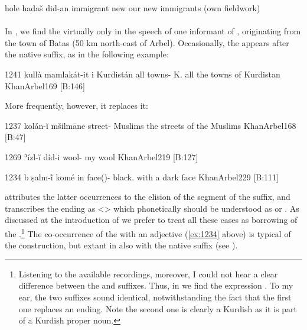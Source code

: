 {hole hadaš did-an}
{immigrant new \pl}
{our new immigrants}
{}{(own fieldwork)}

\paragraph{\Arb}

In \Arb, we find the  \ez* virtually only in the speech of one informant of \citet{KhanArbel}, originating from the town of Batas (50 km north-east of Arbel). Occasionally, the \ez* appears after the native \ed suffix, as in the following example:

{1241}
{kullà mamlakát-it \cb{}i\footnotemark{} Kurdistán}
{all towns-\cst{} \ez\cb{} K.}
{all the towns of Kurdistan}
{KhanArbel}{169 {[B:146]}}


More frequently, however, it replaces it:

 
{1237}
{kolā́n-ĭ mšilmāne}
{street-\ez{} Muslims}
{the streets of the Muslims}
{KhanArbel}{168 {[B:47]}}

{1269}
{ʾízl-ĭ díd-i}
{wool-\ez{} \sg}
{my wool}
{KhanArbel}{219 {[B:127]}}

{1234}
{b\cb{} ṣalm-ĭ́  komé}
{in\cb{} face(\pl)-\ez{} black.\pl}
{with a dark face}
{KhanArbel}{229 {[B:111]}}


\citet[168]{KhanArbel} attributes the latter occurrences to the elision of the  segment of the \ed suffix, and transcribes the ending as <> which phonetically should be understood as \phonetic[ə] or \phonetic[ɪ]. As discussed at the introduction of  we prefer to treat all these cases as borrowing of the \ez*.\footnote{Listening to the available recordings, moreover, I could not hear a clear difference between the  and  suffixes. Thus, in \citet[540 {[B:145]}]{KhanArbel} we find the expression . To my ear, the two  suffixes sound identical, notwithstanding the fact that the first one replaces an  ending. Note the second one is clearly a Kurdish \ez* as it is part of a Kurdish proper noun.} The co-occurrence of the \ez* with an adjective (\ref{ex:1234} above) is typical of the  construction, but extant in \Arb also with the native \ed suffix (see ).



